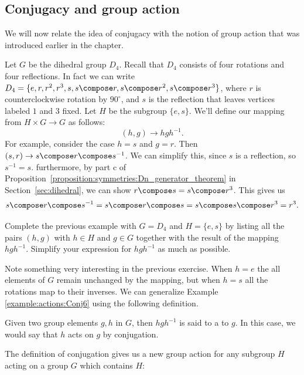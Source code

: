 \subsection*{Conjugacy and group action}

We will now relate the idea of conjugacy with the notion of group action that was introduced earlier in the chapter.


\begin{example}\label{example:actions:Conj6}
Let $G$ be the dihedral group $D_4$.  Recall that $D_4$ consists of four rotations and four reflections.  In fact we can write $D_4=\{e, r, r^2, r^3, s,s\compose r,s\compose r^2,s\compose r^3\}$, where $r$ is counterclockwise rotation by $90^{\circ}$, and $s$ is the reflection that leaves vertices labeled $1$ and $3$ fixed.  Let $H$ be the subgroup $\{e,s\}$.  
We'll define our mapping from $H\times G \rightarrow G$ as follows:
$$(h,g) \rightarrow hgh^{-1}. $$
For example, consider the case $h=s$ and $g=r$. Then $(s,r) \rightarrow s\compose r \compose s^{-1}$.  We can simplify this, since $s$ is a reflection, so $s^{-1}=s$.  furthermore, by part c of Proposition~\ref{proposition:symmetries:Dn_generator_theorem}  in Section~\ref{sec:dihedral}, we can show $r\compose s =s\compose r^3$.  This gives us
$$ s\compose r\compose s^{-1}=s\compose r\compose s=s\compose s\compose r^3=r^3.$$

\end {example}
\begin{exercise}\label{exercise:actions:Conj7}
Complete the previous example with $G=D_4$ and $H=\{e,s\}$ by listing all the pairs $(h,g)$ with $h\in H$ and $g \in G$ together with the result of the mapping $hgh^{-1}$.  Simplify your expression for $hgh^{-1}$ as much as possible.
\end{exercise}
Note something very interesting in the previous exercise.  When $h=e$ the all elements of $G$ remain unchanged by the mapping, but when $h=s$ all the rotations map to their inverses.
 We can generalize Example \ref{example:actions:Conj6} using the following definition.

\begin{defn}
Given two group elements $g,h$ in $G$, then $hgh^{-1}$ is said to a  to $g$. In this case, we would say that $h$ acts on $g$ by conjugation.
\end{defn}
The definition of conjugation gives us a new group action for any subgroup $H$ acting on a group $G$ which contains $H$:

